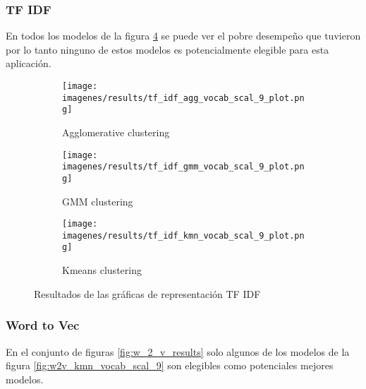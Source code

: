 \documentclass[12pt]{article}
\begin{document}
		\subsubsection{TF IDF}
		En todos los modelos de la figura \ref{fig:tf_idf_results} se puede ver el pobre desempeño que tuvieron por lo tanto ninguno de estos modelos es potencialmente elegible para esta aplicación.
			\begin{figure}[h]
			\centering\begin{subfigure}[b]{0.5\linewidth} 
				\centering\texttt{[image: imagenes/results/tf\_idf\_agg\_vocab\_scal\_9\_plot.png]} 
				\caption{\label{fig:tfidf_agg_vocab_scal_9}Agglomerative clustering} 
			\end{subfigure}\hfill
			\begin{subfigure}[b]{0.5\linewidth} 
				\centering\texttt{[image: imagenes/results/tf\_idf\_gmm\_vocab\_scal\_9\_plot.png]} 
				\caption{\label{fig:tfidf_gmm_vocab_scal_9}GMM clustering} 
			\end{subfigure}\vspace{10pt}
			
			\begin{subfigure}[b]{\linewidth} 
				\centering\texttt{[image: imagenes/results/tf\_idf\_kmn\_vocab\_scal\_9\_plot.png]} 
				\caption{\label{fig:tfidf_kmn_vocab_scal_9}Kmeans clustering} 
			\end{subfigure} 
			\caption{Resultados de las gráficas de representación TF IDF} 
			\label{fig:tf_idf_results}
			\end{figure} 		
						
		\subsubsection{Word to Vec}
		En el conjunto de figuras \ref{fig:w_2_v_results} solo algunos de los modelos de la figura \ref{fig:w2v_kmn_vocab_scal_9} son elegibles como potenciales mejores modelos.
		
\end{document}
